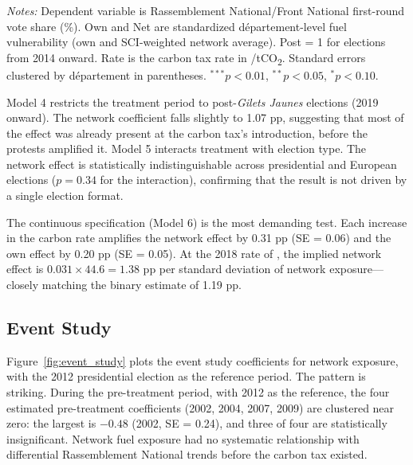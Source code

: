 \documentclass[12pt]{article}
\providecommand{\euro}{\texteuro}
\newcommand{\rn}{Rassemblement National}
\newcommand{\fn}{Front National}
\newcommand{\gj}{\textit{Gilets Jaunes}}
\newcommand{\dept}{d\'{e}partement}
\begin{document}
\begin{table}[H]
\begin{threeparttable}
\begin{tabular}{@{}lcccccc@{}}
\bottomrule
\end{tabular}
\begin{tablenotes}
\small
\item \textit{Notes:} Dependent variable is \rn{}/\fn{} first-round vote share (\%). Own and Net are standardized \dept{}-level fuel vulnerability (own and SCI-weighted network average). Post = 1 for elections from 2014 onward. Rate is the carbon tax rate in \euro/tCO\textsubscript{2}. Standard errors clustered by \dept{} in parentheses. $^{***}p<0.01$, $^{**}p<0.05$, $^{*}p<0.10$.
\end{tablenotes}
\end{threeparttable}
\end{table}

Model 4 restricts the treatment period to post-\gj{} elections (2019 onward). The network coefficient falls slightly to 1.07 pp, suggesting that most of the effect was already present at the carbon tax's introduction, before the protests amplified it. Model 5 interacts treatment with election type. The network effect is statistically indistinguishable across presidential and European elections ($p = 0.34$ for the interaction), confirming that the result is not driven by a single election format.

The continuous specification (Model 6) is the most demanding test. Each \euro 10 increase in the carbon rate amplifies the network effect by 0.31 pp (SE = 0.06) and the own effect by 0.20 pp (SE = 0.05). At the 2018 rate of \euro 44.60, the implied network effect is $0.031 \times 44.6 = 1.38$ pp per standard deviation of network exposure---closely matching the binary estimate of 1.19 pp.

\subsection{Event Study}

Figure~\ref{fig:event_study} plots the event study coefficients for network exposure, with the 2012 presidential election as the reference period. The pattern is striking. During the pre-treatment period, with 2012 as the reference, the four estimated pre-treatment coefficients (2002, 2004, 2007, 2009) are clustered near zero: the largest is $-0.48$ (2002, SE = 0.24), and three of four are statistically insignificant. Network fuel exposure had no systematic relationship with differential \rn{} trends before the carbon tax existed.
\end{document}
